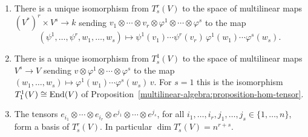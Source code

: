 \begin{proposition}\label{multilinear-algebra:proposition-tensors-multilinear}
\begin{enumerate}
\item There is a unique isomorphism from $T^r_s(V)$ to the space of multilinear maps $(V^*)^r \times V^s \to k$ sending
$v_1 \otimes \cdots \otimes v_r \otimes \varphi^1 \otimes \cdots \otimes \varphi^s$ to the map
\[
(\psi^1, \ldots, \psi^r, w_1, \ldots, w_s) \longmapsto \psi^1(v_1) \cdots \psi^r(v_r)\,\varphi^1(w_1) \cdots \varphi^s(w_s).
\]
\item There is a unique isomorphism from $T^1_s(V)$ to the space of multilinear maps $V^s \to V$ sending $v \otimes \varphi^1 \otimes \cdots \otimes \varphi^s$ to the map
$(w_1, \ldots, w_s) \mapsto \varphi^1(w_1) \cdots \varphi^s(w_s)\,v$. For $s = 1$ this is the isomorphism $T^1_1(V) \cong \operatorname{End}(V)$ of
Proposition~\ref{multilinear-algebra:proposition-hom-tensor}.
\item The tensors $e_{i_1} \otimes \cdots \otimes e_{i_r} \otimes e^{j_1} \otimes \cdots \otimes e^{j_s}$, for all $i_1, \ldots, i_r, j_1, \ldots, j_s \in \{1, \ldots, n\}$, form a basis of
$T^r_s(V)$. In particular $\dim T^r_s(V) = n^{r+s}$.
\end{enumerate}
\end{proposition}

